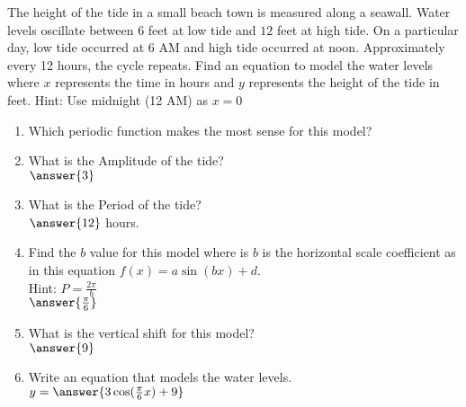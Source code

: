 \documentclass{ximera}
\author{David Kish}
\begin{document}
\begin{exercise}
The height of the tide in a small beach town is measured along a seawall. Water levels oscillate between $6$ feet at low tide and $12$ feet at high tide. On a particular day, low tide occurred at 6 AM and high tide occurred at noon. Approximately every 12 hours, the cycle repeats. Find an equation to model the water levels where $x$ represents the time in hours and $y$ represents the height of the tide in feet. Hint: Use midnight (12 AM) as $x=0$
\begin{enumerate}
\item Which periodic function makes the most sense for this model?
\wordChoice{\choice{$\sin$}\choice[correct]{$\cos$}\choice{$\tan$}}
\item What is the Amplitude of the tide?\\
$\answer{3}$
\item What is the Period of the tide?\\
$\answer{12}$ hours.
\item Find the $b$ value for this model where is $b$ is the horizontal scale coefficient as in this equation $f(x)=a\sin(bx)+d$. \\
Hint: $P=\frac{2\pi}{b}$\\
$\answer{\frac{\pi}{6}}$
\item What is the vertical shift for this model?\\
$\answer{9}$
\item Write an equation that models the water levels.\\
$y=\answer{3\cos(\frac{\pi}{6}x)+9}$
\end{enumerate}
\end{exercise}
\end{document}
